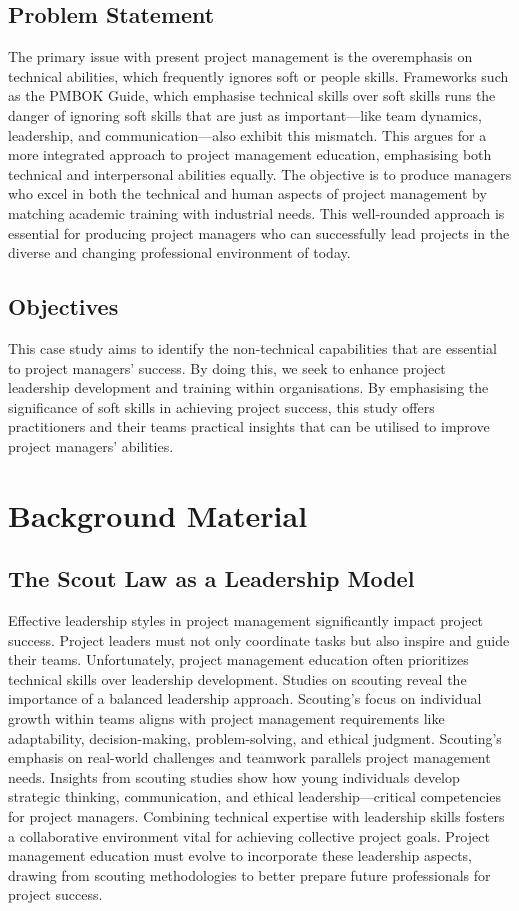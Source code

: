 \documentclass{article}
\begin{document}
\subsection{Problem Statement}
The primary issue with present project management is the overemphasis on technical abilities, which frequently ignores soft or people skills. Frameworks such as the PMBOK Guide, which emphasise technical skills over soft skills runs the danger of ignoring soft skills that are just as important—like team dynamics, leadership, and communication—also exhibit this mismatch. This argues for a more integrated approach to project management education, emphasising both technical and interpersonal abilities equally. The objective is to produce managers who excel in both the technical and human aspects of project management by matching academic training with industrial needs. This well-rounded approach is essential for producing project managers who can successfully lead projects in the diverse and changing professional environment of today. \cite{pant2008project}



\subsection{Objectives}
This case study aims to identify the non-technical capabilities that are essential to project managers' success. By doing this, we seek to enhance project leadership development and training within organisations. By emphasising the significance of soft skills in achieving project success, this study offers practitioners and their teams practical insights that can be utilised to improve project managers' abilities.

\section{Background Material}
\subsection{The Scout Law as a Leadership Model}

Effective leadership styles in project management significantly impact project success. Project leaders must not only coordinate tasks but also inspire and guide their teams. Unfortunately, project management education often prioritizes technical skills over leadership development. Studies on scouting reveal the importance of a balanced leadership approach. Scouting's focus on individual growth within teams aligns with project management requirements like adaptability, decision-making, problem-solving, and ethical judgment. Scouting's emphasis on real-world challenges and teamwork parallels project management needs. Insights from scouting studies show how young individuals develop strategic thinking, communication, and ethical leadership—critical competencies for project managers. Combining technical expertise with leadership skills fosters a collaborative environment vital for achieving collective project goals. Project management education must evolve to incorporate these leadership aspects, drawing from scouting methodologies to better prepare future professionals for project success. \cite{kaluzny2022scouting}
\end{document}
